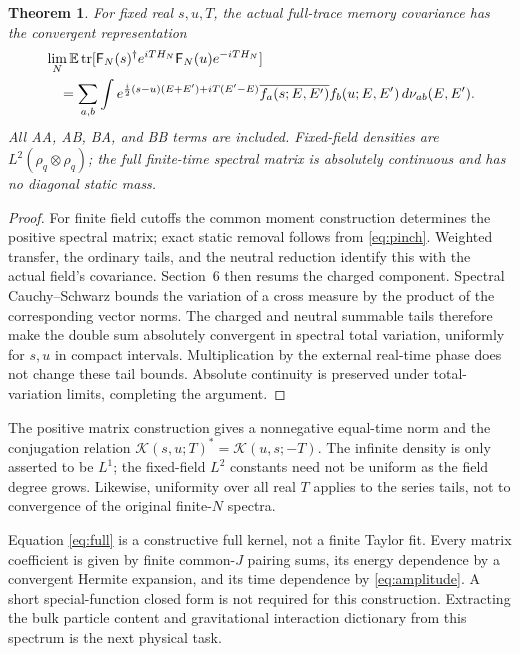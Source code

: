 \documentclass[11pt]{article}
\newcommand{\EE}{\mathbb E}
\newcommand{\tr}{\operatorname{tr}}
\newtheorem{theorem}{Theorem}
\begin{document}
\begin{theorem}
For fixed real $s,u,T$, the actual full-trace memory covariance has
the convergent representation
\begin{align}
 &\lim_N\EE\tr[\mathsf F_N(s)^\dagger
 e^{iTH_N}\mathsf F_N(u)e^{-iTH_N}]\notag\\
 &\quad=\sum_{a,b}\int
 e^{\frac i2(s-u)(E+E')+iT(E'-E)}
 \overline{f_a(s;E,E')}f_b(u;E,E')\,d\nu_{ab}(E,E').
 \label{eq:full}
\end{align}
All AA, AB, BA, and BB terms are included. Fixed-field densities
are $L^2(\rho_q\otimes\rho_q)$; the full finite-time spectral
matrix is absolutely continuous and has no diagonal static mass.
\end{theorem}
\begin{proof}
For finite field cutoffs the common moment construction determines
the positive spectral matrix; exact static removal follows from
\eqref{eq:pinch}. Weighted transfer, the ordinary tails, and the
neutral reduction identify this with the actual field's covariance.
Section~6 then resums the charged component.
Spectral Cauchy--Schwarz bounds the variation of a cross measure by
the product of the corresponding vector norms. The charged and
neutral summable tails therefore make the double sum absolutely
convergent in spectral total variation, uniformly for $s,u$ in
compact intervals. Multiplication by the external real-time phase
does not change these tail bounds. Absolute continuity is preserved
under total-variation limits, completing the argument.
\end{proof}

The positive matrix construction gives a nonnegative equal-time
norm and the conjugation relation
$\mathcal K(s,u;T)^*=\mathcal K(u,s;-T)$.
The infinite density is only asserted to be $L^1$; the fixed-field
$L^2$ constants need not be uniform as the field degree grows.
Likewise, uniformity over all real $T$ applies to the series tails,
not to convergence of the original finite-$N$ spectra.

Equation \eqref{eq:full} is a constructive full kernel, not a finite
Taylor fit. Every matrix coefficient is given by finite common-$J$
pairing sums, its energy dependence by a convergent Hermite expansion,
and its time dependence by \eqref{eq:amplitude}. A short special-function
closed form is not required for this construction. Extracting the
bulk particle content and gravitational interaction dictionary from
this spectrum is the next physical task.

\newpage
\end{document}
